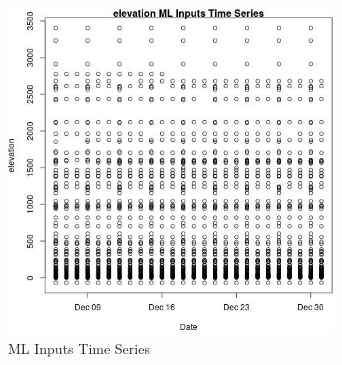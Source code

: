 \begin{figure} 
\centering  
\includegraphics[width=0.77\textwidth]{Code_Outputs/Report_ML_input_PM25_Step4_part_e_de_duplicated_aves_elevationvDate.jpg} 
\caption{\label{fig:Report_ML_input_PM25_Step4_part_e_de_duplicated_aveselevationvDate}ML Inputs Time Series} 
\end{figure} 
 
